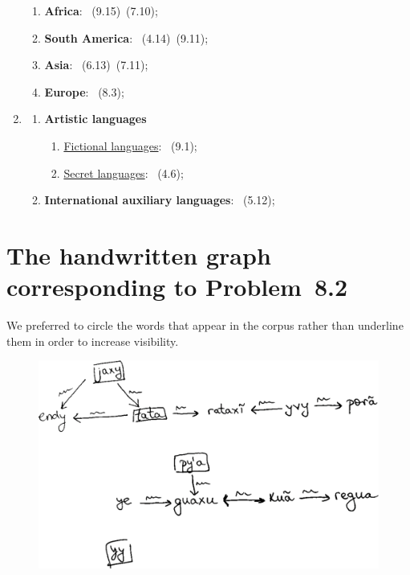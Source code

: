 \begin{enumerate}
    \begin{enumerate}
        \item \textbf{Africa}: \langnameChabu\ (9.15)\EnumComma\langnameSandawe\ (7.10);
        \item \textbf{South America}: \langnameTicuna\ (4.14)\EnumComma\langnameWaorani\ (9.11);
        \item \textbf{Asia}: \langnameAinu\ (6.13)\EnumComma\langnameBurushaski\ (7.11);
        \item \textbf{Europe}: \langnameBasque\ (8.3);
    \end{enumerate}
    \item \MakeUppercase{\textbf{\langlanguages{\famArtificial\ (\famConstructed)}}}
    \begin{enumerate}
        \item \textbf{Artistic languages}
        \begin{enumerate}
            \item \uline{Fictional languages}: \langnameQuenya\ (9.1);
            \item \uline{Secret languages}: \langnameLaMi\ (4.6);
        \end{enumerate}
        \item \textbf{International auxiliary languages}: \langnameAfrihili\ (5.12);
    \end{enumerate}
\end{enumerate}


\chapter{The handwritten graph corresponding to Problem~8.2}
\label{appendix:3}

We preferred to circle the words that appear in the corpus rather than underline them in order to increase visibility.

\begin{figure}[H]
\includegraphics[width=\linewidth]{images/Handdrawn-graph-8.2.png}
\end{figure}
